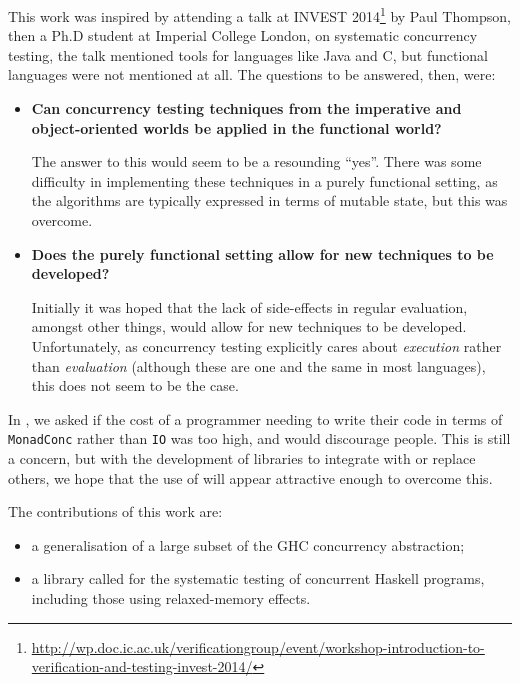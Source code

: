 This work was inspired by attending a talk at INVEST
2014\footnote{\url{http://wp.doc.ic.ac.uk/verificationgroup/event/workshop-introduction-to-verification-and-testing-invest-2014/}}
by Paul Thompson, then a Ph.D student at Imperial College London, on
systematic concurrency testing, the talk mentioned tools for languages
like Java and C, but functional languages were not mentioned at
all. The questions to be answered, then, were:

\begin{itemize}
\item \textbf{Can concurrency testing techniques from the imperative
    and object-oriented worlds be applied in the functional world?}
  \hfill

  The answer to this would seem to be a resounding ``yes''. There was
  some difficulty in implementing these techniques in a purely
  functional setting, as the algorithms are typically expressed in
  terms of mutable state, but this was overcome.

\item \textbf{Does the purely functional setting allow for new
    techniques to be developed?} \hfill

  Initially it was hoped that the lack of side-effects in regular
  evaluation, amongst other things, would allow for new techniques to
  be developed. Unfortunately, as concurrency testing explicitly cares
  about \emph{execution} rather than \emph{evaluation} (although these
  are one and the same in most languages), this does not seem to be
  the case.
\end{itemize}

In \citep{dejafu}, we asked if the cost of a programmer needing to
write their code in terms of \verb|MonadConc| rather than \verb|IO|
was too high, and would discourage people. This is still a concern,
but with the development of libraries to integrate with or replace
others, we hope that the use of \dejafu{} will appear attractive
enough to overcome this.

The contributions of this work are:

\begin{itemize}
\item a generalisation of a large subset of the GHC concurrency
  abstraction;

\item a library called \dejafu{} for the systematic testing of
  concurrent Haskell programs, including those using relaxed-memory
  effects.
\end{itemize}
